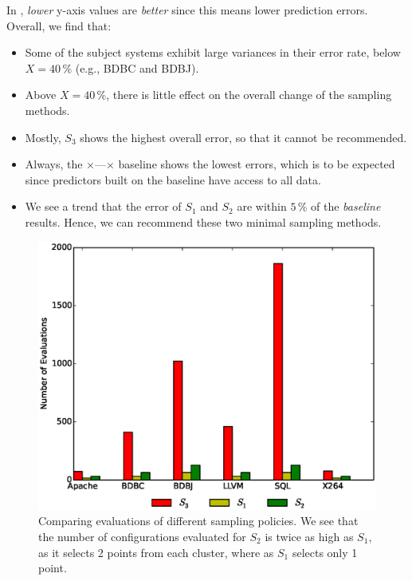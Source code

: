 
In , {\em lower} y-axis values  are {\em better} since this means lower
prediction errors. Overall, we find that:
\begin{itemize}

\item Some of the subject systems exhibit large variances in their error rate, below $X=40$\,\% (e.g., BDBC and BDBJ).
\item Above $X=40$\,\%, there is little effect on the overall change of the sampling methods.
\item
Mostly, $S_3$ shows the highest overall error, 
so that it cannot be recommended.
\item Always, the   $\times$\hspace{-2pt}---\hspace{-2pt}$\times$ baseline shows the lowest errors, which is to be
expected since predictors built on the baseline have access to all data.
\item
We see a trend that the error of  $S_1$ and $S_2$ are within $5$\,\% of the {\em baseline} results.
Hence, we can recommend these two minimal sampling methods.
\end{itemize}

\begin{figure}[t]
\centering
\includegraphics[width=0.75\columnwidth]{Figures/evaluation_graph}
\caption{Comparing evaluations of different sampling policies. We see that the number of configurations evaluated for $S_2$ is twice as high as $S_1$, as it selects 2 points from each cluster, where as  $S_1$ selects only 1 point. }\label{fig:Evaluations}
\end{figure}

